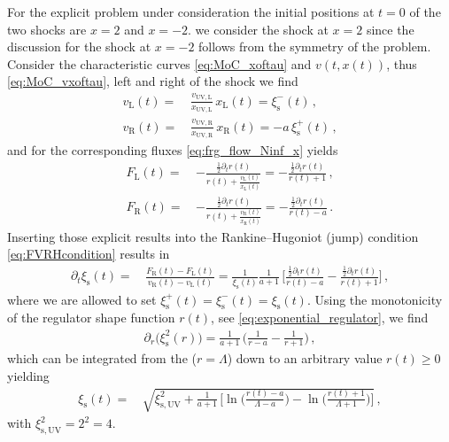 For the explicit problem under consideration the initial positions at $t = 0$ of the two shocks are $x = 2$ and $x = - 2$.
\WlogA{} we consider the shock at $x=2$ since the discussion for the shock at $x=-2$ follows from the symmetry of the problem.
Consider the characteristic curves \eqref{eq:MoC_xoftau} and $v ( t, x ( t ) )$, thus \cref{eq:MoC_vxoftau}, left and right of the shock we find
\begin{subequations}
\begin{align}
	v_\mathrm{L} ( t ) = \, & \frac{v_{\mathrm{UV}, \mathrm{L}}}{x_{\mathrm{UV}, \mathrm{L}}} \, x_\mathrm{L} ( t ) = \xi_\mathrm{s}^- ( t ) \, ,\\
	v_\mathrm{R} ( t ) = \, & \frac{v_{\mathrm{UV}, \mathrm{R}}}{x_{\mathrm{UV}, \mathrm{R}}} \, x_\mathrm{R} ( t ) = - a \, \xi_\mathrm{s}^+ ( t )\, ,
\end{align}
\end{subequations}
and for the corresponding fluxes \cref{eq:frg_flow_Ninf_x} yields
\begin{subequations}
\begin{align}
	F_\mathrm{L} ( t ) = \, & - \frac{\frac{1}{2} \partial_t r ( t )}{r ( t ) + \frac{v_\mathrm{L} ( t )}{x_\mathrm{L} ( t )}} = - \frac{\frac{1}{2} \partial_t r ( t )}{r ( t ) + 1} \, ,\\
	F_\mathrm{R} ( t ) = \, & - \frac{\frac{1}{2} \partial_t r ( t )}{r ( t ) + \frac{v_\mathrm{R} ( t )}{x_\mathrm{R} ( t )}} = - \frac{\frac{1}{2} \partial_t r ( t )}{r ( t ) - a} \, .
\end{align}
\end{subequations}
Inserting those explicit results into the Rankine–Hugoniot (jump) condition \eqref{eq:FVRHcondition} results in
\begin{align}
	\partial_t \xi_\mathrm{s} ( t ) = \, & \frac{F_\mathrm{R} ( t ) - F_\mathrm{L} ( t )}{v_\mathrm{R} ( t ) - v_\mathrm{L} ( t )} = \frac{1}{\xi_\mathrm{s} ( t )} \frac{1}{a + 1} \, \bigg[ \frac{\frac{1}{2} \partial_t r ( t )}{r ( t ) - a} - \frac{\frac{1}{2} \partial_t r ( t )}{r ( t ) + 1} \bigg]	\, ,
\end{align}
where we are allowed to set $\xi_\mathrm{s}^+ ( t ) = \xi_\mathrm{s}^- ( t ) = \xi_\mathrm{s} ( t )$.
Using the monotonicity of the regulator shape function $r ( t )$, see \cref{eq:exponential_regulator}, we find
\begin{align}
	\partial_r \big( \xi_\mathrm{s}^2 ( r ) \big) = \frac{1}{a + 1} \, \bigg( \frac{1}{r - a} - \frac{1}{r + 1} \bigg)\, ,
\end{align}
which can be integrated from the \uv{} ($r=\Lambda$) down to an arbitrary value $r(t)\geq 0$ yielding
\begin{align}
	\xi_\mathrm{s} ( t ) = \, & \sqrt{ \xi_{\mathrm{s},\mathrm{UV}}^2 + \frac{1}{a + 1} \, \bigg[ \ln \bigg( \frac{r ( t ) - a}{\Lambda - a} \bigg) - \ln \bigg( \frac{r ( t ) + 1}{\Lambda + 1} \bigg) \bigg] }	\, ,\label{eq:xioft}
\end{align}
with $\xi_{\mathrm{s},\mathrm{UV}}^2 =2^2=4$.

